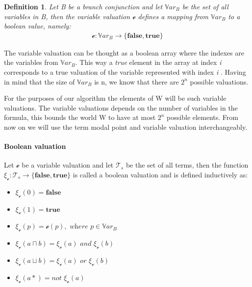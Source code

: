 \documentclass{article}
\newtheorem{defn}{Definition}[section]
\newcommand{\curvedE}{\mathscr{e}}
\newcommand{\Var}{\mathbb{V}ar}
\newcommand{\vBool}{\xi}
\newcommand{\Ts}{\mathcal{T}_s}
\begin{document}
	\begin{defn}\label{variable-valuation}
		Let B be a branch conjunction and let $\Var_B$ be the set of all variables in B, then the variable valuation $\curvedE$ defines a mapping from $\Var_B$ to a boolean value, namely:
		\begin{align*}
			\curvedE : \Var_B \rightarrow \{ \textbf{false}, \textbf{true}\}
		\end{align*}
	\end{defn}
	The variable valuation can be thought as a boolean array where the indexes are the variables from $\Var_B$. This way a \emph{true} element in the array at index \emph{i} corresponds to a true valuation of the variable represented with index \emph{i} . Having in mind that the size of $\Var_B$ is n, we know that there are $2^n$ possible valuations. 

For the purposes of our algorithm the elements of W will be such variable valuations. The variable valuations depends on the number of variables in the formula, this bounds the world W to have at most $2^n$ possible elements. From now on we will use the term modal point and variable valuation interchangeably.

	\paragraph{Boolean valuation}
		Let $\curvedE$ be a variable valuation and let $\Ts$ be the set of all terms,
		then the function $\vBool_{\curvedE} : \Ts \rightarrow \{ \textbf{false}, \textbf{true}\}$ is called a boolean valuation and is defined inductively as:
		\begin{itemize}
			\item $\vBool_{\curvedE}(0) = \textbf{false}$
			\item $\vBool_{\curvedE}(1) = \textbf{true}$
			\item $\vBool_{\curvedE}(p) = \curvedE(p), \textit{ where } p \in \Var_B$
			\item $\vBool_{\curvedE}(a \sqcap b) = \vBool_{\curvedE}(a) \textit{ and } \vBool_{\curvedE}(b)$
			\item $\vBool_{\curvedE}(a \sqcup b) = \vBool_{\curvedE}(a) \textit{ or } \vBool_{\curvedE}(b)$
			\item $\vBool_{\curvedE}(a*) = \textit{not } \vBool_{\curvedE}(a)$
		\end{itemize}
	
\end{document}
